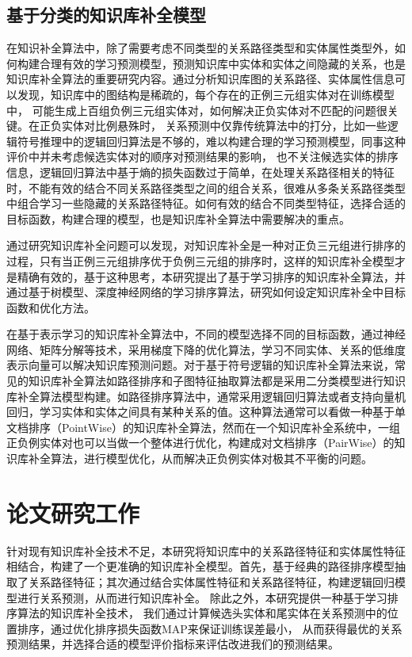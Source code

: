 \subsection{基于分类的知识库补全模型}
在知识补全算法中，除了需要考虑不同类型的关系路径类型和实体属性类型外，如何构建合理有效的学习预测模型，预测知识库中实体和实体之间隐藏的关系，也是知识库补全算法的重要研究内容。通过分析知识库图的关系路径、实体属性信息可以发现，知识库中的图结构是稀疏的，每个存在的正例三元组实体对在训练模型中，
可能生成上百组负例三元组实体对，如何解决正负实体对不匹配的问题很关键。在正负实体对比例悬殊时，
关系预测中仅靠传统算法中的打分，比如一些逻辑符号推理中的逻辑回归算法是不够的，难以构建合理的学习预测模型，同事这种评价中并未考虑候选实体对的顺序对预测结果的影响，
也不关注候选实体的排序信息，逻辑回归算法中基于熵的损失函数过于简单，在处理关系路径相关的特征时，不能有效的结合不同关系路径类型之间的组合关系，很难从多条关系路径类型中组合学习一些隐藏的关系路径特征。如何有效的结合不同类型特征，选择合适的目标函数，构建合理的模型，也是知识库补全算法中需要解决的重点。

通过研究知识库补全问题可以发现，对知识库补全是一种对正负三元组进行排序的过程，只有当正例三元组排序优于负例三元组的排序时，这样的知识库补全模型才是精确有效的，基于这种思考，本研究提出了基于学习排序的知识库补全算法，并通过基于树模型、深度神经网络的学习排序算法，研究如何设定知识库补全中目标函数和优化方法。

在基于表示学习的知识库补全算法中，不同的模型选择不同的目标函数，通过神经网络、矩阵分解等技术，采用梯度下降的优化算法，学习不同实体、关系的低维度表示向量可以解决知识库预测问题。对于基于符号逻辑的知识库补全算法来说，常见的知识库补全算法如路径排序和子图特征抽取算法都是采用二分类模型进行知识库补全算法模型构建。如路径排序算法中，通常采用逻辑回归算法或者支持向量机回归，学习实体和实体之间具有某种关系的值。这种算法通常可以看做一种基于单文档排序（PointWise）的知识库补全算法，然而在一个知识库补全系统中，一组正负例实体对也可以当做一个整体进行优化，构建成对文档排序（PairWise）的知识库补全算法，进行模型优化，从而解决正负例实体对极其不平衡的问题。

\section{论文研究工作}

针对现有知识库补全技术不足，本研究将知识库中的关系路径特征和实体属性特征相结合，构建了一个更准确的知识库补全模型。首先，基于经典的路径排序模型抽取了关系路径特征；其次通过结合实体属性特征和关系路径特征，构建逻辑回归模型进行关系预测，从而进行知识库补全。
除此之外，本研究提供一种基于学习排序算法的知识库补全技术，
我们通过计算候选头实体和尾实体在关系预测中的位置排序，通过优化排序损失函数MAP来保证训练误差最小，
从而获得最优的关系预测结果，并选择合适的模型评价指标来评估改进我们的预测结果。

